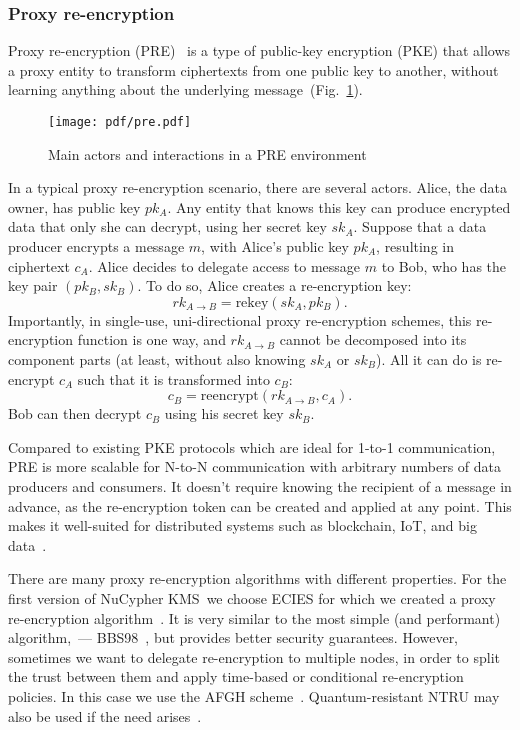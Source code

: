 \documentclass[longbibliography,nofootinbib]{revtex4-1}
\newcommand{\kms}{NuCypher KMS}
\newcommand{\figref}[1]{Fig.~\ref{#1}}
\begin{document}
\subsubsection{Proxy re-encryption}
Proxy re-encryption (PRE)~\cite{wiki:pre,nunez2017proxy} is a type of public-key encryption (PKE) that allows a proxy entity to transform ciphertexts
from one public key to another, without learning anything about the underlying message~(\figref{fig:pre}).

\begin{figure}
\centering
    \texttt{[image: pdf/pre.pdf]}
    \caption{Main actors and interactions in a PRE environment}
    \label{fig:pre}
\end{figure}

In a typical proxy re-encryption scenario, there are several actors.
Alice, the data owner, has public key $pk_A$. Any entity that knows this key can produce encrypted data that only she can decrypt, using her secret key $sk_A$.
Suppose that a data producer encrypts a message $m$, with Alice's public key $pk_A$,
resulting in ciphertext $c_A$.
Alice decides to delegate access to message $m$ to Bob, who has the key pair $(pk_B, sk_B)$.
To do so, Alice creates a re-encryption key:
\begin{equation}
    rk_{A\rightarrow B} = \text{rekey}(sk_A, pk_B).
\end{equation}
Importantly, in single-use, uni-directional proxy re-encryption schemes, this re-encryption function is one way, and $rk_{A\rightarrow B}$ cannot be decomposed into its component parts
(at least, without also knowing $sk_A$ or $sk_B$).
All it can do is re-encrypt $c_A$ such that it is transformed into $c_B$:
\begin{equation}
    c_B = \text{reencrypt}(rk_{A\rightarrow B}, c_{A}).
\end{equation}
Bob can then decrypt $c_{B}$ using his secret key $sk_{B}$.

Compared to existing PKE protocols which are ideal for 1-to-1 communication, PRE is more scalable for N-to-N communication
with arbitrary numbers of data producers and consumers.
It doesn't require knowing the recipient of a message in advance, as the re-encryption token can be created and applied at any point.
This makes it well-suited for distributed systems such as blockchain, IoT, and big data~\cite{web:nucypher-hadoop}.

There are many proxy re-encryption algorithms with different properties.
For the first version of \kms~we choose ECIES for which we created a proxy re-encryption algorithm~\cite{umbral-spec}.
It is very similar to the most simple (and performant) algorithm,~--- BBS98~\cite{BBS98}, but provides better security guarantees.
However, sometimes we want to delegate re-encryption to multiple nodes, in order to split the trust between them and apply time-based or conditional
re-encryption policies.
In this case we use the AFGH scheme~\cite{AFGH}.
Quantum-resistant NTRU may also be used if the need arises~\cite{wiki:ntru,ntrureencrypt}.
\end{document}
